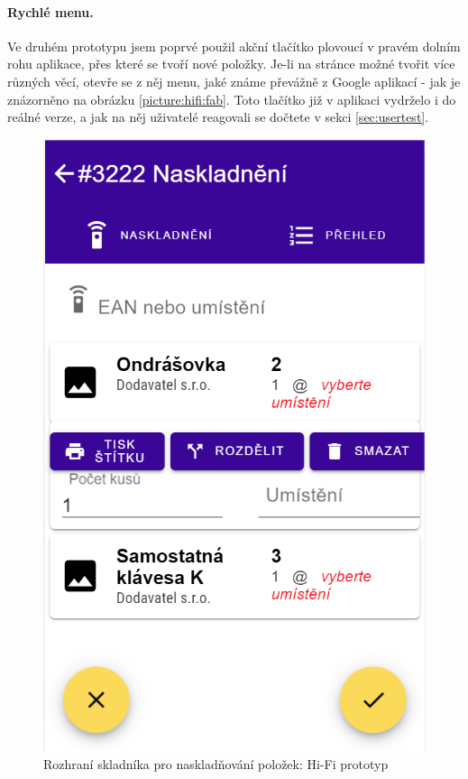 \paragraph{Rychlé menu.} Ve druhém prototypu jsem poprvé použil akční tlačítko plovoucí v pravém dolním rohu aplikace, přes které se tvoří nové položky. Je-li na stránce možné tvořit více různých věcí, otevře se z něj menu, jaké známe převážně z Google aplikací - jak je znázorněno na obrázku \ref{picture:hifi:fab}. Toto tlačítko již v aplikaci vydrželo i do reálné verze, a jak na něj uživatelé reagovali se dočtete v sekci \ref{sec:usertest}.

\begin{figure}[h]
\includegraphics[height=0.5\textheight]{../png/hifi/naskladneni.png}
\caption{Rozhraní skladníka pro naskladňování položek: Hi-Fi prototyp} \label{picture:hifi:naskladneni}
\end{figure}

